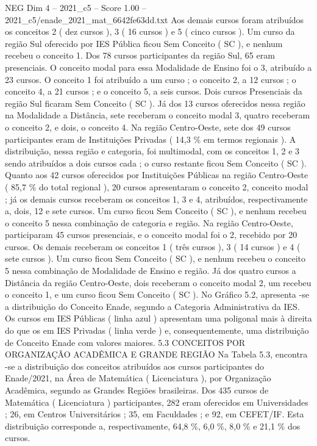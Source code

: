 \begin{textsample}{NEG Dim 4 – 2021\_c5 – Score 1.00 – 2021\_c5/enade\_2021\_mat\_6642fe63dd.txt}
Aos demais cursos foram atribuídos os conceitos 2 ( dez cursos ), 3 ( 16 cursos ) e 5 ( cinco cursos ).
Um curso da região Sul oferecido por IES Pública ficou Sem Conceito ( SC ), e nenhum recebeu o conceito 1.
Dos 78 cursos participantes da região Sul, 65 eram presenciais.
O conceito modal para essa Modalidade de Ensino foi o 3, atribuído a 23 cursos.
O conceito 1 foi atribuído a um curso ; o conceito 2, a 12 cursos ; o conceito 4, a 21 cursos ; e o conceito 5, a seis cursos.
Dois cursos Presenciais da região Sul ficaram Sem Conceito ( SC ).
Já dos 13 cursos oferecidos nessa região na Modalidade a Distância, sete receberam o conceito modal 3, quatro receberam o conceito 2, e dois, o conceito 4.
Na região Centro-Oeste, sete dos 49 cursos participantes eram de Instituições Privadas ( 14,3 \% em termos regionais ).
A distribuição, nessa região e categoria, foi multimodal, com os conceitos 1, 2 e 3 sendo atribuídos a dois cursos cada ; o curso restante ficou Sem Conceito ( SC ).
Quanto aos 42 cursos oferecidos por Instituições Públicas na região Centro-Oeste ( 85,7 \% do total regional ), 20 cursos apresentaram o conceito 2, conceito modal ; já os demais cursos receberam os conceitos 1, 3 e 4, atribuídos, respectivamente a, dois, 12 e sete cursos.
Um curso ficou Sem Conceito ( SC ), e nenhum recebeu o conceito 5 nessa combinação de categoria e região.
Na região Centro-Oeste, participaram 45 cursos presenciais, e o conceito modal foi o 2, recebido por 20 cursos.
Os demais receberam os conceitos 1 ( três cursos ), 3 ( 14 cursos ) e 4 ( sete cursos ).
Um curso ficou Sem Conceito ( SC ), e nenhum recebeu o conceito 5 nessa combinação de Modalidade de Ensino e região.
Já dos quatro cursos a Distância da região Centro-Oeste, dois receberam o conceito modal 2, um recebeu o conceito 1, e um curso ficou Sem Conceito ( SC ).
No Gráfico 5.2, apresenta -se a distribuição do Conceito Enade, segundo a Categoria Administrativa da IES.
Os cursos em IES Públicas ( linha azul ) apresentam uma poligonal mais à direita do que os em IES Privadas ( linha verde ) e, consequentemente, uma distribuição de Conceito Enade com valores maiores. 5.3 CONCEITOS POR ORGANIZAÇÃO ACADÊMICA E GRANDE REGIÃO Na Tabela 5.3, encontra -se a distribuição dos conceitos atribuídos aos cursos participantes do Enade/2021, na Área de Matemática ( Licenciatura ), por Organização Acadêmica, segundo as Grandes Regiões brasileiras.
Dos 435 cursos de Matemática ( Licenciatura ) participantes, 282 eram oferecidos em Universidades ; 26, em Centros Universitários ; 35, em Faculdades ; e 92, em CEFET/IF.
Esta distribuição corresponde a, respectivamente, 64,8 \%, 6,0 \%, 8,0 \% e 21,1 \% dos cursos.

\end{textsample}
